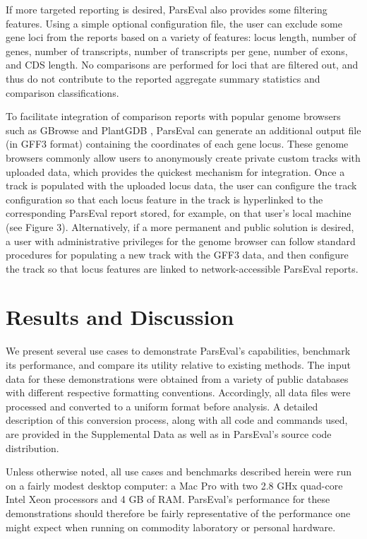 If more targeted reporting is desired, ParsEval also provides some filtering features.
Using a simple optional configuration file, the user can exclude some gene loci from the reports based on a variety of features: locus length, number of genes, number of transcripts, number of transcripts per gene, number of exons, and CDS length.
No comparisons are performed for loci that are filtered out, and thus do not contribute to the reported aggregate summary statistics and comparison classifications.

To facilitate integration of comparison reports with popular genome browsers such as GBrowse  \citep{GBrowse} and PlantGDB  \citep{Duvick}, ParsEval can generate an additional output file (in GFF3 format) containing the coordinates of each gene locus.
These genome browsers commonly allow users to anonymously create private custom tracks with uploaded data, which provides the quickest mechanism for integration.
Once a track is populated with the uploaded locus data, the user can configure the track configuration so that each locus feature in the track is hyperlinked to the corresponding ParsEval report stored, for example, on that user's local machine (see Figure 3).
Alternatively, if a more permanent and public solution is desired, a user with administrative privileges for the genome browser can follow standard procedures for populating a new track with the GFF3 data, and then configure the track so that locus features are linked to network-accessible ParsEval reports.


\section{Results and Discussion}
We present several use cases to demonstrate ParsEval's capabilities, benchmark its performance, and compare its utility relative to existing methods.
The input data for these demonstrations were obtained from a variety of public databases with different respective formatting conventions.
Accordingly, all data files were processed and converted to a uniform format before analysis.
A detailed description of this conversion process, along with all code and commands used, are provided in the Supplemental Data as well as in ParsEval's source code distribution.

Unless otherwise noted, all use cases and benchmarks described herein were run on a fairly modest desktop computer: a Mac Pro with two 2.8 GHx quad-core Intel Xeon processors and 4 GB of RAM.
ParsEval's performance for these demonstrations should therefore be fairly representative of the performance one might expect when running on commodity laboratory or personal hardware.


